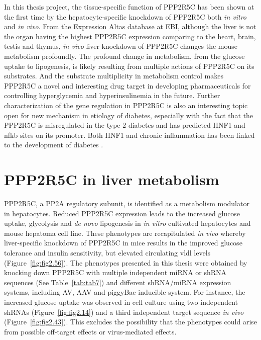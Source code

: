 
In this thesis project, the tissue-specific function of PPP2R5C has been shown at the first time by the hepatocyte-specific knockdown of PPP2R5C both \textit{in vitro} and \textit{in vivo}. From the Expression Altas database at EBI, although the liver is not the organ having the highest PPP2R5C expression comparing to the heart, brain, testis and thymus, \textit{in vivo} liver knockdown of PPP2R5C changes the mouse metabolism profoundly. The profound change in metabolism, from the glucose uptake to lipogenesis, is likely resulting from multiple actions of PPP2R5C on its substrates. And the substrate multiplicity in metabolism control makes PPP2R5C a novel and interesting drug target in developing pharmaceuticals for controlling hyperglycemia and hyperinsulinemia in the future. Further characterization of the gene regulation in PPP2R5C is also an interesting topic open for new mechanism in etiology of diabetes, especially with the fact that the PPP2R5C is misregulated in the type 2 diabetes and has predicted HNF1\textalpha{} and \gls{nfkb} sites on its promoter. Both HNF1\textalpha{} and chronic inflammation has been linked to the development of diabetes \cite{owen_monogenic_2013,patel_role_2009}.   

\section{PPP2R5C in liver metabolism}

PPP2R5C, a PP2A regulatory subunit, is identified as a metabolism modulator in hepatocytes. Reduced PPP2R5C expression leads to the increased glucose uptake, glycolysis and \textit{de novo} lipogenesis in \textit{in vitro} cultivated hepatocytes and mouse hepatoma cell line. These phenotypes are recapitulated \textit{in vivo} whereby liver-specific knockdown of PPP2R5C in mice results in the  improved glucose tolerance and insulin sensitivity, but elevated circulating \gls{vldl} levels (Figure~\ref{fig:fig2.56}). The phenotypes presented in this thesis were obtained by knocking down PPP2R5C with multiple independent miRNA or shRNA sequences (See Table~\ref{tab:tab7}) and different shRNA/miRNA expression systems, including \gls{AV}, \gls{AAV} and piggyBac inducible system. For instance, the increased glucose uptake was observed in cell culture using two independent shRNAs (Figure~\ref{fig:fig2.14}) and a third independent target sequence \textit{in vivo} (Figure~\ref{fig:fig2.43}). This excludes the possibility that the phenotypes could arise from possible off-target effects or virus-mediated effects. 


